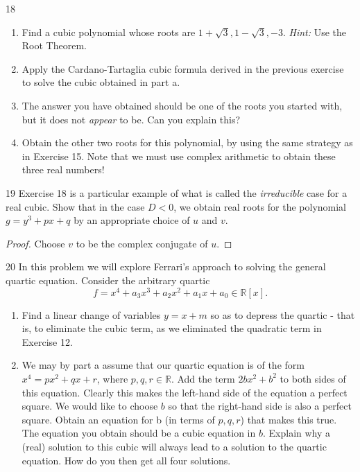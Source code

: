\begin{problem}{18}
    \begin{enumerate}
        \item[(a)] Find a cubic polynomial whose roots are $1 + \sqrt{3}, 1 - \sqrt{3}, -3$.
        \emph{Hint:} Use the Root Theorem.
        \item[(b)] Apply the Cardano-Tartaglia cubic formula derived in the previous
        exercise to solve the cubic obtained in part a.
        \item[(c)] The answer you have obtained should be one of the roots you started
        with, but it does not \emph{appear} to be. Can you explain this?
        \item[(d)] Obtain the other two roots for this polynomial, by using the same
        strategy as in Exercise 15. Note that we must use complex arithmetic to obtain
        these three real numbers!
    \end{enumerate}
\end{problem}
\unsolved

\begin{problem}{19}
    Exercise 18 is a particular example of what is called the \emph{irreducible}
    case for a real cubic. Show that in the case $D < 0$, we obtain real roots 
    for the polynomial $g = y^3 + px + q$ by an appropriate choice of $u$ and $v$.
\end{problem}
\solved

\begin{proof}
    Choose $v$ to be the complex conjugate of $u$.
\end{proof}

\begin{problem}{20}
    In this problem we will explore Ferrari's approach to solving the 
    general quartic equation. Consider the arbitrary quartic
    \[f = x^4 + a_3 x^3 + a_2 x^2 + a_1 x + a_0 \in \mathbb{R}[x].\]
    \begin{enumerate}
        \item Find a linear change of variables $y = x + m$ so as to depress the quartic 
                - that is, to eliminate the cubic term, as we eliminated the quadratic term in Exercise 12.
        \item We may by part a assume that our quartic equation is of the form $x^4 = px^2 + qx + r$, 
                where $p, q, r \in \mathbb{R}$. Add the term $2bx^2 + b^2$ to both sides of this equation.
                Clearly this makes the left-hand side of the equation a perfect square. We would like to 
                choose $b$ so that the right-hand side is also a perfect square. Obtain an equation for 
                b (in terms of $p, q, r$) that makes this true. The equation you obtain should be a cubic 
                equation in $b$. Explain why a (real) solution to this cubic will always lead to a solution to the 
                quartic equation. How do you then get all four solutions.
    \end{enumerate}
\end{problem}
\solved

